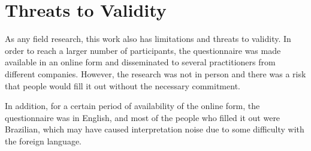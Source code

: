 \documentclass[conference]{IEEEtran}
\begin{document}

\section{Threats to Validity}
\label{thread}


As any field research, this work also has limitations and threats to validity. In order to reach a larger number of participants, the questionnaire was made available in an online form and disseminated to several practitioners from different companies. However, the research was not in person and there was a risk that people would fill it out without the necessary commitment.


In addition, for a certain period of availability of the online form, the questionnaire was in English, and most of the people who filled it out were Brazilian, which may have caused interpretation noise due to some difficulty with the foreign language.

\end{document}

